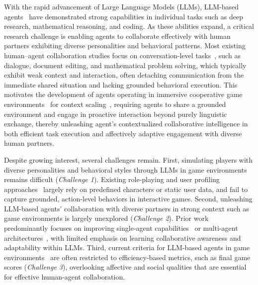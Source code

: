 \documentclass{article}
\theoremstyle{plain}
\theoremstyle{definition}
\theoremstyle{remark}
\begin{document}
With the rapid advancement of Large Language Models (LLMs), LLM-based agents~\cite{WangMFZYZCTCLZWW24,XiCGHDHZWJZZFWXZWJZLYDW25,zhang2025landscape} have demonstrated strong capabilities in individual tasks such as deep research, mathematical reasoning, and coding. As these abilities expand, a critical research challenge is enabling agents to collaborate effectively with human partners exhibiting diverse personalities and behavioral patterns. Most existing human--agent collaboration studies focus on conversation-level tasks~\cite{WangYZQSBN024,WuGP0LDC0L025,zhang2025echo}, such as dialogue, document editing, and mathematical problem solving, which typically exhibit weak context and interaction, often detaching communication from the immediate shared situation and lacking grounded behavioral execution. This motivates the development of agents operating in immersive cooperative game environments~\cite{hu2024survey} for context scaling~\cite{wang2026alphacontext}, requiring agents to share a grounded environment and engage in proactive interaction beyond purely linguistic exchange, thereby unleashing agent's contextualized collaborative intelligence in both efficient task execution and affectively adaptive engagement with diverse human partners.


Despite growing interest, several challenges remain. First, simulating players with diverse personalities and behavioral styles through LLMs in game environments remains difficult (\emph{Challenge 1}). Existing role-playing and user profiling approaches~\cite{WangPQLZWGGN00024,TuFTSSGY24,0001WZY00YGC00X25,SalemiMBZ24} largely rely on predefined characters or static user data, and fail to capture grounded, action-level behaviors in interactive games. Second, unleashing LLM-based agents’ collaboration with diverse partners in strong context such as game environments is largely unexplored (\emph{Challenge 2}). Prior work predominantly focuses on improving single-agent capabilities~\cite{feng2025group,wang2025ragen,xi2025agentgymrl} or multi-agent architectures~\cite{ZhangDSZDTSG24,ZhangYHWLSZZLZC24,SeoNLLLK25}, with limited emphasis on learning collaborative awareness and adaptability within LLMs. Third, current criteria for LLM-based agents in game environments~\cite{costarelli2024gamebench,xi2025agentgym,hu2025lmgame} are often restricted to efficiency-based metrics, such as final game scores (\emph{Challenge 3}), overlooking affective and social qualities that are essential for effective human-agent collaboration.
\end{document}

